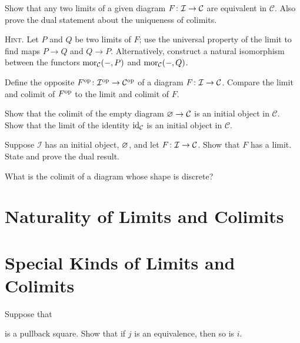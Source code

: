 \bs
\ben[label=(\alph*)]
\item  
\item 
\een
\es

\bp
Show that any two limits of a given diagram $F \colon \mathcal{I} \to \mathcal{C}$ are equivalent in $\mathcal{C}$. Also prove the dual statement about the uniqueness of colimits.

{\scshape Hint.} Let $P$ and $Q$ be two limits of $F$; use the universal property of the limit to find maps $P \to Q$ and $Q \to P$. Alternatively, construct a natural isomorphism between the functors $\operatorname{mor}_{\mathcal{C}}( - , P)$ and $\operatorname{mor}_{\mathcal{C}}( -,Q)$.
\ep

\bs
\es

\bx
Define the opposite $F^{\mathrm{op}} \colon \mathcal{I}^{\mathrm{op}} \to \mathcal{C}^{\mathrm{op}}$ of a diagram $F \colon\mathcal{I} \to\mathcal{C}$. Compare the limit and colimit of $F^{\mathrm{op}}$ to the limit and colimit of $F$.
\ex

\bs
\es

\bx
Show that the colimit of the empty diagram $\varnothing \to \mathcal{C}$ is an initial object in $\mathcal{C}$. Show that the limit of the identity $\mathrm{id}_\mathcal{C}$ is an initial object in $\mathcal{C}$.
\ex

\bs
\es

\bx
Suppose $\mathcal{I}$ has an initial object, $\varnothing$, and let $F \colon \mathcal{I} \to \mathcal{C}$. Show that $F$ has a limit. State and prove the dual result.
\ex

\bs
\es

\bx
What is the colimit of a diagram whose shape is discrete?
\ex

\bs
\es



\section{Naturality of Limits and Colimits}

\section{Special Kinds of Limits and Colimits}

\bp
Suppose that
\bse
{}
\ese
is a pullback square. Show that if $j$ is an equivalence, then so is $i$.

